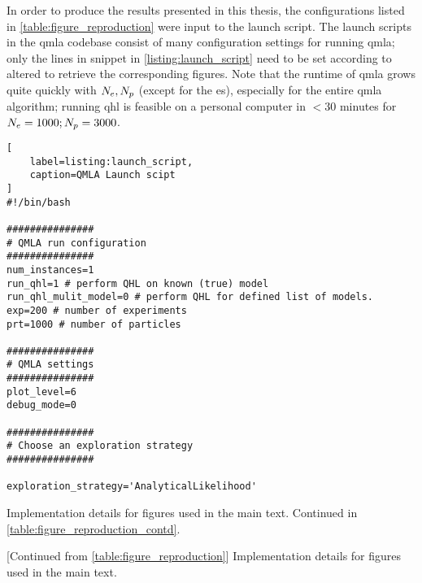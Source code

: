 In order to produce the results presented in this thesis, 
    the configurations listed in \cref{table:figure_reproduction} were input to the launch script.
The launch scripts in the \gls{qmla} codebase consist of many configuration settings for running \gls{qmla};
    only the lines in snippet in \cref{listing:launch_script} need to be set according to 
    altered to retrieve  the corresponding figures.
Note that the runtime of \gls{qmla} grows quite quickly with $N_e, N_p$ (except for the  \gls{es}), 
    especially for the entire \gls{qmla} algorithm; running \gls{qhl} is feasible on a personal computer in 
    $<30$ minutes for $N_e=1000; N_p=3000$. 

\begin{lstlisting}[
    label=listing:launch_script,
    caption=QMLA Launch scipt
]
#!/bin/bash

###############
# QMLA run configuration
###############
num_instances=1
run_qhl=1 # perform QHL on known (true) model
run_qhl_mulit_model=0 # perform QHL for defined list of models.
exp=200 # number of experiments
prt=1000 # number of particles

###############
# QMLA settings
###############
plot_level=6
debug_mode=0

###############
# Choose an exploration strategy 
###############

exploration_strategy='AnalyticalLikelihood'

\end{lstlisting}


\renewcommand{\arraystretch}{1.25} %
\setlength{\tabcolsep}{5pt}

\clearpage
\begin{table}[h!]
    \begin{center}
        
    \end{center}
    \caption[Figure implementation details]{Implementation details for figures used in the main text. 
        Continued in \cref{table:figure_reproduction_contd}.
    }
    \label{table:figure_reproduction}
\end{table}

\clearpage
\begin{table}[h!]
        \begin{center}
            
        \end{center}
        \caption[Figure implementation details continued]{[Continued from \cref{table:figure_reproduction}] Implementation details for figures used in the main text.}
        \label{table:figure_reproduction_contd}
\end{table}
    
\clearpage